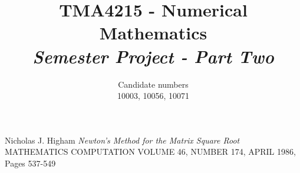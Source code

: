 \documentclass[11pt,a4paper,notitlepage,openright]{article}
\title{TMA4215 - Numerical Mathematics\\
\vspace*{0.5cm}
\Large{\textit{Semester Project - Part Two}}}
\author{Candidate numbers\\
10003, 10056, 10071}
\def\biblio{ %
\clearpage

\thispagestyle{empty}

}
\def\bibliosub{\biblio \listoftodos} %
\def\subtoc{\tableofcontents}
\begin{document}
\def\bibliosub{} %
\def\subtoc{}


\maketitle  %

\setcounter{page}{1}    %
\pagestyle{plain}

%

\cleardoublepage



\pagestyle{fancy}

\setlength{\headheight}{15pt}
\fancyhf{}
\fancyhead[LE,RO]{\thepage}
\fancyhead[RE]{\textit{{\leftmark}}}
\fancyhead[LO]{\textit{\nouppercase{\rightmark}}}
 
\setcounter{page}{1}    %

\setlength{\headheight}{15pt}



%






\begin{thebibliography}{00}
 Nicholas J. Higham \textit{Newton's Method for the Matrix Square Root} MATHEMATICS COMPUTATION VOLUME 46, NUMBER 174, APRIL 1986, Pages 537-549
\end{thebibliography}

\thispagestyle{empty}
\pagebreak
\end{document}

